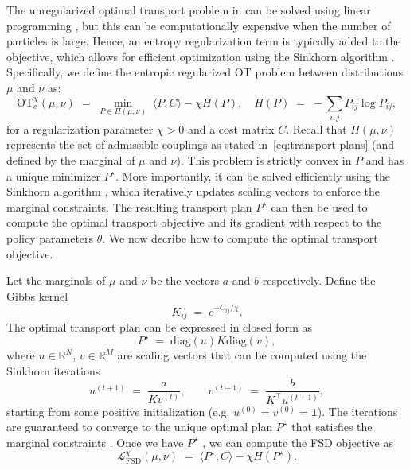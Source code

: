
The unregularized optimal transport problem in  can be solved using linear programming \citep{dantzig2016linear, dvurechensky2018computational}, but this can be computationally expensive when the number of particles is large. Hence, an entropy regularization term is typically added to the objective,
which allows for efficient optimization using the Sinkhorn algorithm \citep{cuturi2013sinkhorn}. Specifically, we define the entropic regularized OT problem between distributions $\mu$ and $\nu$ as:
\begin{equation}
  \mathrm{OT}_{c}^\chi(\mu,\nu) \;=\; \min_{P\in\Pi(\mu,\nu)}\;\langle P,C\rangle - \chi H(P), \quad H(P)\;=\;-\sum_{i,j} P_{ij}\log P_{ij},
  \label{eq:entropic-ot}
\end{equation}
for a regularization parameter $\chi>0$ and a cost matrix $C$. Recall that $\Pi(\mu,\nu)$ represents the set of admissible couplings as stated in~\eqref{eq:transport-plans} (and defined by the marginal of $\mu$ and $\nu$). This problem is strictly convex in  $P$  and has a unique minimizer  $P^\star$. More importantly, it can be solved efficiently using the Sinkhorn algorithm \citep{cuturi2013sinkhorn}, which iteratively updates scaling vectors to enforce the marginal constraints. The resulting transport plan  $P^\star$  can then be used to compute the optimal transport objective and its gradient with respect to the policy parameters  $\theta$. We now decribe how to compute the optimal transport objective.

Let the marginals of $\mu$ and $\nu$ be the vectors $a$ and $b$ respectively. Define the Gibbs kernel
\begin{equation}K_{ij} \;=\; e^{-C_{ij}/\chi}.
  \label{eq:gibbs-kernel}
\end{equation}The optimal transport plan can be expressed in closed form as
\begin{equation}P^\star \;=\; \mathrm{diag}(u) K \mathrm{diag}(v),
  \label{eq:optimal-plan}
\end{equation}where  $u \in \mathbb{R}^N$, $v\in\mathbb{R}^M$  are scaling vectors that can be computed using the Sinkhorn iterations
\begin{equation}u^{(t+1)} \;=\; \frac{a}{Kv^{(t)}}, \qquad v^{(t+1)} \;=\; \frac{b}{K^\top u^{(t+1)}},
  \label{eq:sinkhorn-iterations}
\end{equation}starting from some positive initialization (e.g.  $u^{(0)}=v^{(0)}=\mathbf 1$). The iterations are guaranteed to converge to the unique optimal plan  $P^\star$  that satisfies the marginal constraints \citep{peyre2020computationaloptimaltransport, cuturi2013sinkhorn}. Once we have  $P^\star$ , we can compute the FSD objective as
\begin{equation}
  \mathcal{L}_{\mathrm{FSD}}^\chi(\mu,\nu) \;=\; \langle P^\star,C\rangle - \chi H(P^\star).
  \label{eq:fsd-loss-sinkhorn}
\end{equation}

